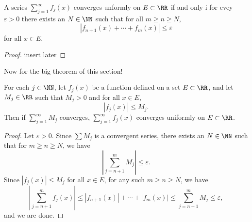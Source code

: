 \begin{theorem}
A series $\sum\limits_{j=1}^\infty f_j(x)$ converges unformly on $E \subset \RR$ if and only i for evey $\varepsilon > 0$ there exists an $N \in \NN$ such that for all $m \geq n \geq N$, 
\[ |f_{n+1}(x) + \cdots + f_m(x)| \leq \varepsilon \] for all $x \in E$. 
\end{theorem}
\begin{proof}
insert later 
\end{proof}
\newpage
Now for the big theorem of this section!
\begin{theorem}
For each $j \in \NN$, let $f_j(x)$ be a function defined on a set $E \subset \RR$, and let $M_j \in \RR$ such that $M_j > 0$ and for all $x \in E$, 
\[ |f_j(x)| \leq M_j. \] Then if $\sum\limits_{j=1}^\infty M_j$ converges, $\sum\limits_{j=1}^\infty f_j(x)$ converges uniformly on $E \subset \RR$. 
\end{theorem}
\begin{proof}
Let $\varepsilon > 0$. Since $\sum M_j$ is a convergent series, there exists an $N \in \NN$ such that for $m \geq n \geq N$, we have \[ \left | \sum_{j=n+1}^m M_j \right | \leq \varepsilon. \] Since $|f_j(x)| \leq M_j$ for all $x \in E$, for any such $m \geq n \geq N$, we have 
\[ \left | \sum_{j=n+1}^m f_j(x) \right | \leq |f_{n+1}(x)| + \cdots + |f_m(x)| \leq \sum_{j=n+1}^m M_j \leq \varepsilon, \] and we are done. 
\end{proof}

